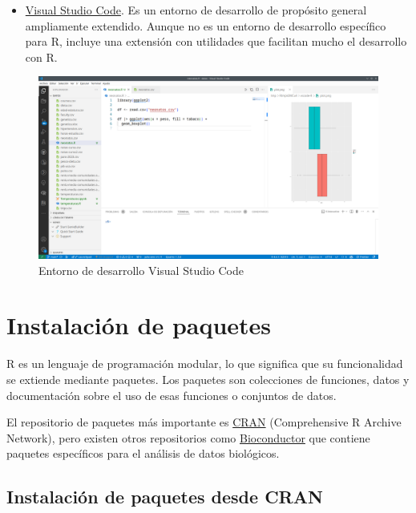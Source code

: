 \documentclass[
  spanish,
  a4paper,
]{scrreport}
\providecommand{\tightlist}{%
  \setlength{\itemsep}{0pt}\setlength{\parskip}{0pt}}
\theoremstyle{definition}
\theoremstyle{remark}
\begin{document}
\begin{itemize}
\tightlist
\item
  \href{https://code.visualstudio.com/}{Visual Studio Code}. Es un
  entorno de desarrollo de propósito general ampliamente extendido.
  Aunque no es un entorno de desarrollo específico para R, incluye una
  extensión con utilidades que facilitan mucho el desarrollo con R.
\end{itemize}

\begin{figure}[H]

{\centering \includegraphics[width=8.33333in,height=\textheight,keepaspectratio]{img/vscode-r.png}

}

\caption{Entorno de desarrollo Visual Studio Code}

\end{figure}%

\section{Instalación de paquetes}\label{instalaciuxf3n-de-paquetes}

R es un lenguaje de programación modular, lo que significa que su
funcionalidad se extiende mediante paquetes. Los paquetes son
colecciones de funciones, datos y documentación sobre el uso de esas
funciones o conjuntos de datos.

El repositorio de paquetes más importante es
\href{https://cran.r-project.org/}{CRAN} (Comprehensive R Archive
Network), pero existen otros repositorios como
\href{https://www.bioconductor.org/}{Bioconductor} que contiene paquetes
específicos para el análisis de datos biológicos.

\subsection{Instalación de paquetes desde
CRAN}\label{instalaciuxf3n-de-paquetes-desde-cran}
\end{document}
